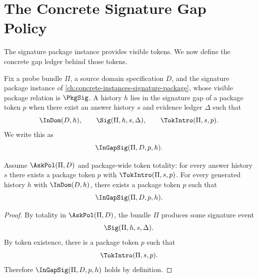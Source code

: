 \chapter{The Concrete Signature Gap Policy}
\label{ch:concrete-instances-gap-policy}

The signature package instance provides visible tokens. We now define the concrete gap ledger behind those tokens.

\begin{definition}
\label{def:signature-gap-membership}
\label{def:gap-membership}
Fix a probe bundle $\Pi$, a source domain specification $D$, and the signature package instance of \autoref{ch:concrete-instances-signature-package}, whose visible package relation is $\PkgSig$. A history $h$ lies in the signature gap of a package token $p$ when there exist an answer history $s$ and evidence ledger $\Delta$ such that
$$
  \InDom(D,h),
  \qquad
  \Sig(\Pi,h,s,\Delta),
  \qquad
  \TokIntro(\Pi,s,p).
$$
We write this as
$$
  \InGapSig(\Pi,D,p,h).
$$
\end{definition}

\begin{lemma}
\label{thm:concrete-gap-coverage}
Assume $\AskPol(\Pi,D)$ and package-wide token totality: for every answer history $s$ there exists a package token $p$ with $\TokIntro(\Pi,s,p)$. For every generated history $h$ with $\InDom(D,h)$, there exists a package token $p$ such that
$$
  \InGapSig(\Pi,D,p,h).
$$
\end{lemma}
\begin{proof}
By totality in $\AskPol(\Pi,D)$, the bundle $\Pi$ produces some signature event
$$
  \Sig(\Pi,h,s,\Delta).
$$
By token existence, there is a package token $p$ such that
$$
  \TokIntro(\Pi,s,p).
$$
Therefore $\InGapSig(\Pi,D,p,h)$ holds by definition.
\end{proof}

